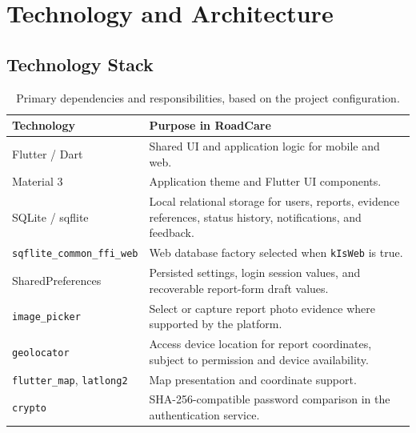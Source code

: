\documentclass[12pt,a4paper]{report}
\begin{document}
\chapter{Technology and Architecture}
\section{Technology Stack}
\begin{table}[H]
\centering
\begin{tabularx}{\textwidth}{p{}X}
\toprule
\textbf{Technology} & \textbf{Purpose in RoadCare} \\
\midrule
Flutter / Dart & Shared UI and application logic for mobile and web. \\
Material 3 & Application theme and Flutter UI components. \\
SQLite / sqflite & Local relational storage for users, reports, evidence references, status history, notifications, and feedback. \\
\texttt{sqflite\_common\_ffi\_web} & Web database factory selected when \texttt{kIsWeb} is true. \\
SharedPreferences & Persisted settings, login session values, and recoverable report-form draft values. \\
\texttt{image\_picker} & Select or capture report photo evidence where supported by the platform. \\
\texttt{geolocator} & Access device location for report coordinates, subject to permission and device availability. \\
\texttt{flutter\_map}, \texttt{latlong2} & Map presentation and coordinate support. \\
\texttt{crypto} & SHA-256-compatible password comparison in the authentication service. \\
\bottomrule
\end{tabularx}
\caption{Primary dependencies and responsibilities, based on the project configuration.}
\end{table}
\end{document}
